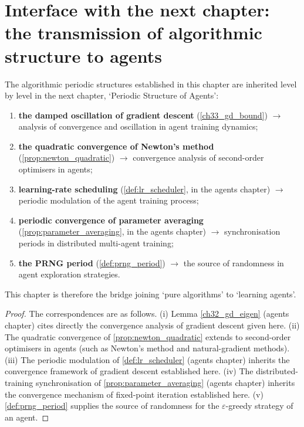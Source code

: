 \section{Interface with the next chapter: the transmission of algorithmic structure to agents}
\label{sec:algorithm_to_agent_interface}

\begin{proposition}\label{prop:algorithm_to_agent_inheritance}
The algorithmic periodic structures established in this chapter are inherited level by level in the next chapter, `Periodic Structure of Agents':
\begin{enumerate}[label=(\roman*)]
    \item \textbf{the damped oscillation of gradient descent} (\cref{ch33_gd_bound}) $\to$ analysis of convergence and oscillation in agent training dynamics;
    \item \textbf{the quadratic convergence of Newton's method} (\cref{prop:newton_quadratic}) $\to$ convergence analysis of second-order optimisers in agents;
    \item \textbf{learning-rate scheduling} (\cref{def:lr_scheduler}, in the agents chapter) $\to$ periodic modulation of the agent training process;
    \item \textbf{periodic convergence of parameter averaging} (\cref{prop:parameter_averaging}, in the agents chapter) $\to$ synchronisation periods in distributed multi-agent training;
    \item \textbf{the PRNG period} (\cref{def:prng_period}) $\to$ the source of randomness in agent exploration strategies.
\end{enumerate}
This chapter is therefore the bridge joining `pure algorithms' to `learning agents'.
\end{proposition}

\begin{proof}
The correspondences are as follows.
(i) Lemma \cref{ch32_gd_eigen} (agents chapter) cites directly the convergence analysis of gradient descent given here.
(ii) The quadratic convergence of \cref{prop:newton_quadratic} extends to second-order optimisers in agents (such as Newton's method and natural-gradient methods).
(iii) The periodic modulation of \cref{def:lr_scheduler} (agents chapter) inherits the convergence framework of gradient descent established here.
(iv) The distributed-training synchronisation of \cref{prop:parameter_averaging} (agents chapter) inherits the convergence mechanism of fixed-point iteration established here.
(v) \cref{def:prng_period} supplies the source of randomness for the $\varepsilon$-greedy strategy of an agent.
\end{proof}

